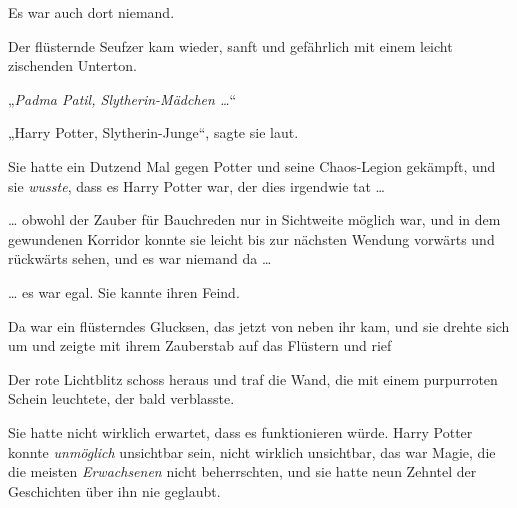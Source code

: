 Es war auch dort niemand.

Der flüsternde Seufzer kam wieder, sanft und gefährlich mit einem leicht zischenden Unterton.

„\emph{Padma Patil, Slytherin-Mädchen …}“

„Harry Potter, Slytherin-Junge“, sagte sie laut.

Sie hatte ein Dutzend Mal gegen Potter und seine Chaos-Legion gekämpft, und sie \emph{wusste}, dass es Harry Potter war, der dies irgendwie tat …

… obwohl der Zauber für Bauchreden nur in Sichtweite möglich war, und in dem gewundenen Korridor konnte sie leicht bis zur nächsten Wendung vorwärts und rückwärts sehen, und es war niemand da …

… es war egal. Sie kannte ihren Feind.

Da war ein flüsterndes Glucksen, das jetzt von neben ihr kam, und sie drehte sich um und zeigte mit ihrem Zauberstab auf das Flüstern und rief 

Der rote Lichtblitz schoss heraus und traf die Wand, die mit einem purpurroten Schein leuchtete, der bald verblasste.

Sie hatte nicht wirklich erwartet, dass es funktionieren würde. Harry Potter konnte \emph{unmöglich} unsichtbar sein, nicht wirklich unsichtbar, das war Magie, die die meisten \emph{Erwachsenen} nicht beherrschten, und sie hatte neun Zehntel der Geschichten über ihn nie geglaubt.

